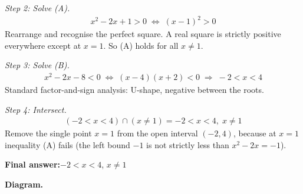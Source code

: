 \documentclass[11pt]{article}
\begin{document}
\textit{Step 2: Solve (A).}
\[\begin{gathered}
x^2 - 2x + 1 > 0 \;\Longleftrightarrow\; (x - 1)^2 > 0
\end{gathered}\]
Rearrange and recognise the perfect square. A real square is strictly positive everywhere except at \( x = 1 \). So (A) holds for all \( x \neq 1 \).

\textit{Step 3: Solve (B).}
\[\begin{gathered}
x^2 - 2x - 8 < 0 \;\Longleftrightarrow\; (x - 4)(x + 2) < 0 \;\Longrightarrow\; -2 < x < 4
\end{gathered}\]
Standard factor-and-sign analysis: U-shape, negative between the roots.

\textit{Step 4: Intersect.}
\[\begin{gathered}
(-2 < x < 4) \cap (x \neq 1) = -2 < x < 4, \; x \neq 1
\end{gathered}\]
Remove the single point \( x = 1 \) from the open interval \( (-2, 4) \), because at \( x = 1 \) inequality (A) fails (the left bound \( -1 \) is not strictly less than \( x^2 - 2x = -1 \)).

\begin{answerbox}
\textbf{Final answer:}\quad \(\displaystyle -2 < x < 4\), \(\displaystyle x \neq 1\)
\end{answerbox}
\textbf{Diagram.}
\end{document}
